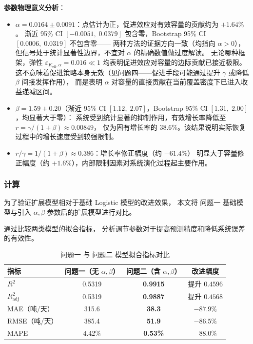 \documentclass[12pt,a4paper]{ctexart}
\begin{document}
\begin{table}[htbp]
\textbf{参数物理意义分析}：
\begin{itemize}
  \item $\alpha = 0.0164 \pm 0.0091$：点估计为正，促进效应对有效容量的贡献约为 $+1.64\%$。
  渐近 95\% CI $[-0.0051,\;0.0379]$ 包含零，Bootstrap 95\% CI $[0.0006,\;0.0319]$ 不包含零——
  两种方法的证据方向一致（均指向 $\alpha > 0$），但信号处于统计显著性边界，不宜对 $\alpha$ 的精确数值做过度解读。
  无论哪种框架，弹性 $\varepsilon_{K_{\text{eff}},\alpha}=0.016 \ll 1$ 均表明促进效应对容量的边际贡献已接近极限。
  这不意味着促进策略本身无效（见问题四——促进手段可能通过提升 $\gamma$ 或降低 $\beta$ 间接发挥作用），
  而是表明 $\alpha$ 对容量的直接贡献在当前覆盖密度下已进入收益递减区间。
  \item $\beta = 1.59 \pm 0.20$（渐近 95\% CI $[1.12,\;2.07]$，Bootstrap 95\% CI $[1.31,\;2.00]$，均显著大于零）：
  系统受到统计显著的抑制作用，有效增长率降低至 $r = \gamma/(1+\beta) \approx 0.00849$，
  仅为固有增长率的 $38.6\%$。该结果说明实际恢复过程中的增长速度受到较强限制。
  \item $r/\gamma = 1/(1+\beta) \approx 0.386$：增长率修正幅度（约 $-61.4\%$）
  明显大于容量修正幅度（约 $+1.6\%$），内部限制因素对系统演化过程起主要作用。
\end{itemize}

\subsubsection{计算}

为了验证扩展模型相对于基础 Logistic 模型的改进效果，
本文将 问题一 基础模型与引入 $\alpha,\beta$ 参数后的扩展模型进行对比。

通过比较两类模型的拟合指标，
分析调节参数对于提高预测精度和降低系统误差的有效性。

\begin{table}[htbp]
\centering
\caption{问题一 与 问题二 模型拟合指标对比}
\label{tab:q1_q2_comparison}
\begin{tabular}{lccc}
\toprule
指标 & 问题一（无 $\alpha,\beta$） & 问题二（含 $\alpha,\beta$） & 改进幅度 \\
\midrule
$R^2$         & 0.5319  & \textbf{0.9915} & 提升 $0.4596$ \\
$R_{\text{adj}}^2$ & 0.5319  & \textbf{0.9887} & 提升 $0.4568$ \\
MAE（吨/天）  & 315.6   & \textbf{38.3}   & $-87.9\%$ \\
RMSE（吨/天） & 385.4   & \textbf{51.9}   & $-86.5\%$ \\
MAPE         & 4.42\%  & \textbf{0.53\%}  & $-88.0\%$ \\
\bottomrule
\end{tabular}
\end{table}


\end{table}
\end{document}
